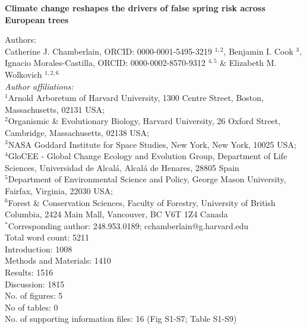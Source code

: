 \documentclass{article}\usepackage[]{graphicx}\usepackage[]{color}
\begin{document}
\noindent 
\textbf{\LARGE{Climate change reshapes the drivers of false spring risk across European trees}} 

\noindent Authors:\\
Catherine J. Chamberlain, ORCID: 0000-0001-5495-3219 $^{1,2}$, Benjamin I. Cook $^{3}$, Ignacio Morales-Castilla, ORCID: 0000-0002-8570-9312 $^{4,5}$ \& Elizabeth M. Wolkovich $^{1,2,6}$
\vspace{2ex}\\
\emph{Author affiliations:}\\
$^{1}$Arnold Arboretum of Harvard University, 1300 Centre Street, Boston, Massachusetts, 02131 USA; \\
$^{2}$Organismic \& Evolutionary Biology, Harvard University, 26 Oxford Street, Cambridge, Massachusetts, 02138 USA; \\
$^{3}$NASA Goddard Institute for Space Studies, New York, New York, 10025 USA; \\
$^{4}$GloCEE - Global Change Ecology and Evolution Group, Department of Life Sciences, Universidad de Alcal\'{a}, Alcal\'{a} de Henares, 28805 Spain \\
$^{5}$Department of Environmental Science and Policy, George Mason University, Fairfax, Virginia, 22030 USA; \\
$^{6}$Forest \& Conservation Sciences, Faculty of Forestry, University of British Columbia, 2424 Main Mall, Vancouver, BC V6T 1Z4 Canada\\
\vspace{2ex}
$^*$Corresponding author: 248.953.0189; cchamberlain@g.harvard.edu\\


Total word count: 5211 \\
Introduction: 1008 \\
Methods and Materials: 1410\\
Results: 1516\\
Discussion: 1815 \\

No. of figures: 5\\
No of tables: 0 \\
No. of supporting information files: 16 (Fig S1-S7; Table S1-S9)\\ 
\end{document}
